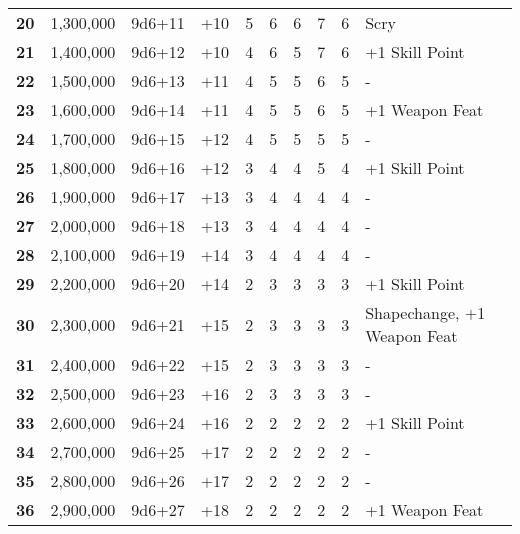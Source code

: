 \begin {table}[H]
\begin{tabularx}{\columnwidth}{>{\bfseries}cccM{.31in}M{.51in}M{.25in}M{.43in}M{.32in}M{.45in}Y}
		20 & 1,300,000 & 9d6+11 & +10 & 5 & 6 & 6 & 7 & 6 & Scry\\
		21 & 1,400,000 & 9d6+12 & +10 & 4 & 6 & 5 & 7 & 6 & +1 Skill Point\\
		22 & 1,500,000 & 9d6+13 & +11 & 4 & 5 & 5 & 6 & 5 & -\\
		23 & 1,600,000 & 9d6+14 & +11 & 4 & 5 & 5 & 6 & 5 & +1 Weapon Feat\\
		24 & 1,700,000 & 9d6+15 & +12 & 4 & 5 & 5 & 5 & 5 & -\\
		25 & 1,800,000 & 9d6+16 & +12 & 3 & 4 & 4 & 5 & 4 & +1 Skill Point\\
		26 & 1,900,000 & 9d6+17 & +13 & 3 & 4 & 4 & 4 & 4 & -\\
		27 & 2,000,000 & 9d6+18 & +13 & 3 & 4 & 4 & 4 & 4 & -\\
		28 & 2,100,000 & 9d6+19 & +14 & 3 & 4 & 4 & 4 & 4 & -\\
		29 & 2,200,000 & 9d6+20 & +14 & 2 & 3 & 3 & 3 & 3 & +1 Skill Point\\
		30 & 2,300,000 & 9d6+21 & +15 & 2 & 3 & 3 & 3 & 3 & Shapechange, +1 Weapon Feat\\
		31 & 2,400,000 & 9d6+22 & +15 & 2 & 3 & 3 & 3 & 3 & -\\
		32 & 2,500,000 & 9d6+23 & +16 & 2 & 3 & 3 & 3 & 3 & -\\
		33 & 2,600,000 & 9d6+24 & +16 & 2 & 2 & 2 & 2 & 2 & +1 Skill Point\\
		34 & 2,700,000 & 9d6+25 & +17 & 2 & 2 & 2 & 2 & 2 & -\\
		35 & 2,800,000 & 9d6+26 & +17 & 2 & 2 & 2 & 2 & 2 & -\\
		36 & 2,900,000 & 9d6+27 & +18 & 2 & 2 & 2 & 2 & 2 & +1 Weapon Feat\
  \end {tabularx}
\end {table}
\newpage
